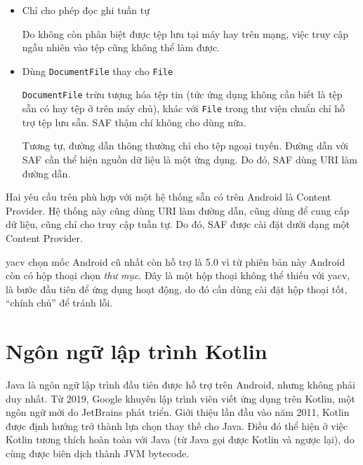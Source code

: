 \documentclass[../../thesis]{subfiles}
\begin{document}
\begin{itemize}
    \item
        Chỉ cho phép đọc ghi tuần tự

        Do không còn phân biệt được tệp lưu tại máy hay trên mạng, việc truy cập
        ngẫu nhiên vào tệp cũng không thể làm được.
    \item
        Dùng \texttt{DocumentFile} thay cho \texttt{File}

        \texttt{DocumentFile} trừu tượng hóa tệp tin (tức ứng dụng không cần
        biết là tệp sẵn có hay tệp ở trên máy chủ), khác với \texttt{File} trong
        thư viện chuẩn chỉ hỗ trợ tệp lưu sẵn. SAF thậm chí không cho dùng
         nữa.

        Tương tự, đường dẫn thông thường chỉ cho tệp ngoại tuyến. Đường dẫn với
        SAF cần thể hiện nguồn dữ liệu là một ứng dụng. Do đó, SAF dùng URI làm
        đường dẫn.
\end{itemize}

Hai yêu cầu trên phù hợp với một hệ thống sẵn có trên Android là Content
Provider. Hệ thống này cũng dùng URI làm đường dẫn, cũng dùng để cung cấp dữ
liệu, cũng chỉ cho truy cập tuần tự. Do đó, SAF được cài đặt dưới dạng một
Content Provider.

yacv chọn mốc Android cũ nhất còn hỗ trợ là 5.0 vì từ phiên bản này Android còn
có hộp thoại chọn \emph{thư mục}. Đây là một hộp thoại không thể thiếu với yacv,
là bước đầu tiên để ứng dụng hoạt động, do đó cần dùng cài đặt hộp thoại tốt,
``chính chủ'' để tránh lỗi.



\section{Ngôn ngữ lập trình Kotlin}\label{sec:kotlin}

Java là ngôn ngữ lập trình đầu tiên được hỗ trợ trên Android, nhưng không phải
duy nhất. Từ 2019, Google khuyên lập trình viên viết ứng dụng trên Kotlin, một
ngôn ngữ mới do JetBrains phát triển. Giới thiệu lần đầu vào năm 2011, Kotlin
được định hướng trở thành lựa chọn thay thế cho Java. Điều đó thể hiện ở việc
Kotlin tương thích hoàn toàn với Java (từ Java gọi được Kotlin và ngược lại), do
cùng được biên dịch thành JVM bytecode.
\end{document}
